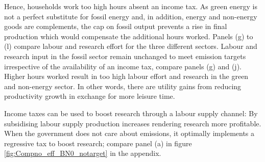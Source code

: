 Hence, households work too high hours absent an income tax. %
As green energy is not a perfect substitute for fossil energy and, in addition, energy and non-energy goods are complements, the cap on fossil output prevents a rise in final production which would compensate the additional hours worked. 
Panels (g) to (l) compare labour and research effort for the three different sectors. Labour and research input in the fossil sector remain unchanged to meet emission targets irrespective of the availability of an income tax, compare panels (g) and (j). Higher hours worked result in too high labour effort and research in the green and non-energy sector. In other words, there are utility gains from reducing productivity growth in exchange for more leisure time.

Income taxes can be used to boost research through a labour supply channel: By subsidising labour supply production increases rendering research more profitable. When the government does not care about emissions, it optimally implements a regressive tax to boost research; compare panel (a) in figure \ref{fig:Compno_eff_BN0_notarget} in the appendix. %


